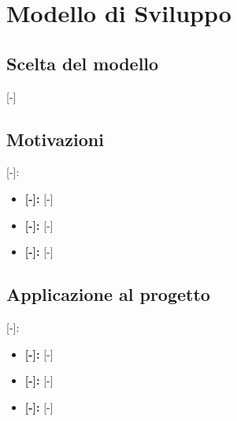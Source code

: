 \section{Modello di Sviluppo}

\subsection{Scelta del modello}
[-]

\subsection{Motivazioni}
[-]:
\begin{itemize}
	\item \textbf{[-]:} [-]
	\item \textbf{[-]:} [-]
	\item \textbf{[-]:} [-]
\end{itemize}

\subsection{Applicazione al progetto}
[-]:
\begin{itemize}
	\item \textbf{[-]:} [-]
	\item \textbf{[-]:} [-]
	\item \textbf{[-]:} [-]
\end{itemize}